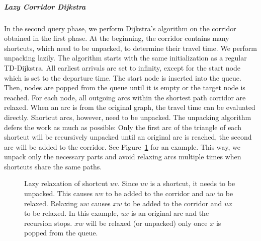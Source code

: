 \documentclass[a4paper,UKenglish,cleveref,autoref]{lipics-v2019}
\begin{document}
\subparagraph*{Lazy Corridor Dijkstra}

In the second query phase, we perform Dijkstra's algorithm on the corridor obtained in the first phase.
At the beginning, the corridor contains many shortcuts, which need to be unpacked, to determine their travel time.
We perform unpacking lazily.
The algorithm starts with the same initialization as a regular TD-Dijkstra.
All earliest arrivals are set to infinity, except for the start node which is set to the departure time.
The start node is inserted into the queue.
Then, nodes are popped from the queue until it is empty or the target node is reached.
For each node, all outgoing arcs within the shortest path corridor are relaxed.
When an arc is from the original graph, the travel time can be evaluated directly.
Shortcut arcs, however, need to be unpacked.
The unpacking algorithm defers the work as much as possible:
Only the first arc of the triangle of each shortcut will be recursively unpacked until an original arc is reached, the second arc will be added to the corridor.
See Figure~\ref{fig:lazy_unpack} for an example.
This way, we unpack only the necessary parts and avoid relaxing arcs multiple times when shortcuts share the same paths.

\begin{figure}
\centering
{}
\caption{
Lazy relaxation of shortcut $u v$.
Since $u v$ is a shortcut, it needs to be unpacked.
This causes $w v$ to be added to the corridor and $u w$ to be relaxed.
Relaxing $u w$ causes $x w$ to be added to the corridor and $u x$ to be relaxed.
In this example, $u x$ is an original arc and the recursion stops.
$x w$ will be relaxed (or unpacked) only once $x$ is popped from the queue.
}\label{fig:lazy_unpack}
\end{figure}
\end{document}
